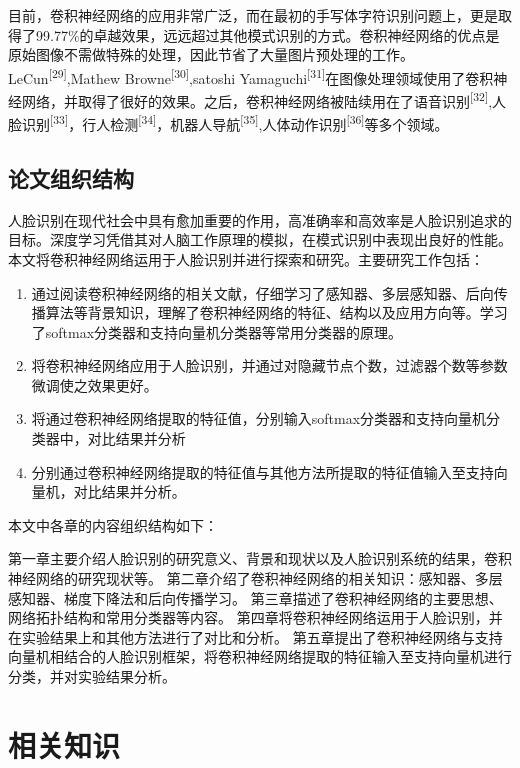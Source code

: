 \documentclass[bachelor,zhspacing]{cqu}  %
\def\tightlist{}
\begin{document}
目前，卷积神经网络的应用非常广泛，而在最初的手写体字符识别问题上，更是取得了99.77\%的卓越效果，远远超过其他模式识别的方式。卷积神经网络的优点是原始图像不需做特殊的处理，因此节省了大量图片预处理的工作。LeCun\textsuperscript{{[}29{]}},Mathew
Browne\textsuperscript{{[}30{]}},satoshi
Yamaguchi\textsuperscript{{[}31{]}}在图像处理领域使用了卷积神经网络，并取得了很好的效果。之后，卷积神经网络被陆续用在了语音识别\textsuperscript{{[}32{]}},人脸识别\textsuperscript{{[}33{]}}，行人检测\textsuperscript{{[}34{]}}，机器人导航\textsuperscript{{[}35{]}},人体动作识别\textsuperscript{{[}36{]}}等多个领域。

\subsection{论文组织结构}\label{ux8bbaux6587ux7ec4ux7ec7ux7ed3ux6784}

人脸识别在现代社会中具有愈加重要的作用，高准确率和高效率是人脸识别追求的目标。深度学习凭借其对人脑工作原理的模拟，在模式识别中表现出良好的性能。本文将卷积神经网络运用于人脸识别并进行探索和研究。主要研究工作包括：

\begin{enumerate}
\def\labelenumi{\arabic{enumi}.}
\tightlist
\item
  通过阅读卷积神经网络的相关文献，仔细学习了感知器、多层感知器、后向传播算法等背景知识，理解了卷积神经网络的特征、结构以及应用方向等。学习了softmax分类器和支持向量机分类器等常用分类器的原理。
\item
  将卷积神经网络应用于人脸识别，并通过对隐藏节点个数，过滤器个数等参数微调使之效果更好。
\item
  将通过卷积神经网络提取的特征值，分别输入softmax分类器和支持向量机分类器中，对比结果并分析
\item
  分别通过卷积神经网络提取的特征值与其他方法所提取的特征值输入至支持向量机，对比结果并分析。
\end{enumerate}

本文中各章的内容组织结构如下：

第一章主要介绍人脸识别的研究意义、背景和现状以及人脸识别系统的结果，卷积神经网络的研究现状等。
第二章介绍了卷积神经网络的相关知识：感知器、多层感知器、梯度下降法和后向传播学习。
第三章描述了卷积神经网络的主要思想、网络拓扑结构和常用分类器等内容。
第四章将卷积神经网络运用于人脸识别，并在实验结果上和其他方法进行了对比和分析。
第五章提出了卷积神经网络与支持向量机相结合的人脸识别框架，将卷积神经网络提取的特征输入至支持向量机进行分类，并对实验结果分析。

\section{相关知识}\label{ux76f8ux5173ux77e5ux8bc6}
\end{document}
